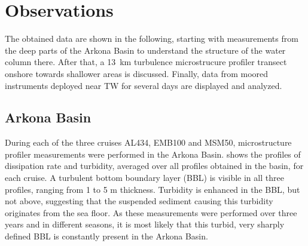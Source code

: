 \section{Observations}

 The obtained data are shown in the following, starting with measurements from 
the 
deep parts of the Arkona Basin to understand the structure of the water 
column there. After that, a 13~km turbulence microstrucure profiler transect 
onshore towards shallower areas is discussed. Finally, data from moored 
instruments deployed near TW for several days are displayed and analyzed.

\subsection{Arkona Basin}

 During each of the three cruises AL434, EMB100 and MSM50, microstructure 
profiler measurements were performed in the Arkona Basin.  shows the 
profiles of 
dissipation rate and turbidity, averaged over all profiles obtained in the 
basin, for each cruise. A turbulent bottom boundary layer (BBL) is visible in 
all three profiles, ranging from 1 to 5 m thickness. 
Turbidity is enhanced in the BBL, but not above, suggesting that the suspended 
sediment causing this turbidity originates from the sea floor. As these 
measurements were performed over three years and in different 
seasons, it is most likely that this turbid, very sharply defined BBL is 
constantly present in the Arkona Basin.


